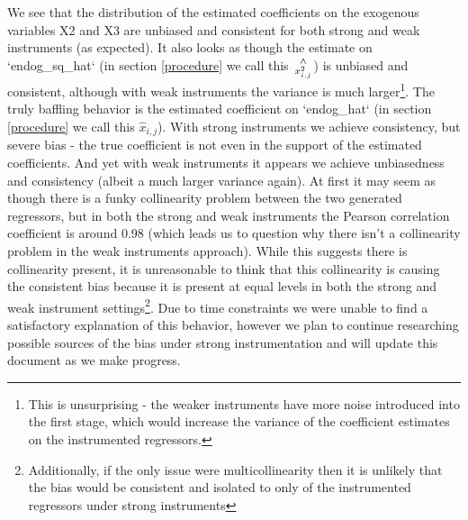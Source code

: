\documentclass[12pt]{article}
\begin{document}
We see that the distribution of the estimated coefficients on the exogenous variables X2 and X3 are unbiased and consistent for both strong and weak instruments (as expected). It also looks as though the estimate on `endog\_sq\_hat` (in section \ref{procedure} we call this ${\wedge \atop x_{i,j}^2}$) is unbiased and consistent, although with weak instruments the variance is much larger\footnote{This is unsurprising - the weaker instruments have more noise introduced into the first stage, which would increase the variance of the coefficient estimates on the instrumented regressors.}. The truly baffling behavior is the estimated coefficient on `endog\_hat` (in section \ref{procedure} we call this $\hat{x}_{i,j}$). With strong instruments we achieve consistency, but severe bias - the true coefficient is not even in the support of the estimated coefficients. And yet with weak instruments it appears we achieve unbiasedness and consistency (albeit a much larger variance again). At first it may seem as though there is a funky collinearity problem between the two generated regressors, but in both the strong and weak instruments the Pearson correlation coefficient is around 0.98 (which leads us to question why there isn't a collinearity problem in the weak instruments approach). While this suggests there is collinearity present, it is unreasonable to think that this collinearity is causing the consistent bias because it is present at equal levels in both the strong and weak instrument settings\footnote{Additionally, if the only issue were multicollinearity then it is unlikely that the bias would be consistent and isolated to only of the instrumented regressors under strong instruments}. Due to time constraints we were unable to find a satisfactory explanation of this behavior, however we plan to continue researching possible sources of the bias under strong instrumentation and will update this document as we make progress.
\end{document}
